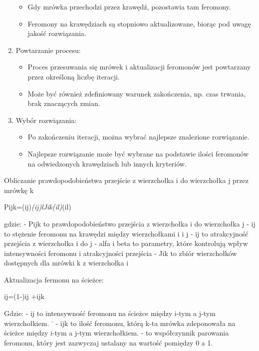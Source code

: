 \documentclass[11pt]{article}
\providecommand{\tightlist}{%
      \setlength{\itemsep}{0pt}\setlength{\parskip}{0pt}}
\begin{document}
\begin{enumerate}
  \begin{itemize}
  \tightlist
  \item
    Gdy mrówka przechodzi przez krawędź, pozostawia tam feromony.
  \item
    Feromony na krawędziach są stopniowo aktualizowane, biorąc pod uwagę
    jakość rozwiązania.
  \end{itemize}
\item
  Powtarzanie procesu:

  \begin{itemize}
  \tightlist
  \item
    Proces przesuwania się mrówek i aktualizacji feromonów jest
    powtarzany przez określoną liczbę iteracji.
  \item
    Może być również zdefiniowany warunek zakończenia, np. czas trwania,
    brak znaczących zmian.
  \end{itemize}
\item
  Wybór rozwiązania:

  \begin{itemize}
  \tightlist
  \item
    Po zakończeniu iteracji, można wybrać najlepsze znalezione
    rozwiązanie.
  \item
    Najlepsze rozwiązanie może być wybrane na podstawie ilości feromonów
    na odwiedzonych krawędziach lub innych kryteriów.
  \end{itemize}
\end{enumerate}

Obliczanie prawdopodobieństwa przejście z wierzchołka i do wierzchołka j
przez mrówkę k

Pijk=(ij)\emph{(ij)lJik(il)}(il)

gdzie: - Pijk to prawdopodobieństwo przejścia z wierzchołka i do
wierzchołka j - ij to stężenie feromonu na krawędzi między wierzchołkami
i i j - ij to atrakcyjność przejścia z wierzchołka i do j - alfa i beta
to parametry, które kontrolują wpływ intensywności feromonu i
atrakcyjności przejścia - Jik to zbiór wierzchołków dostępnych dla
mrówki k z wierzchołka i

Aktualizacja fermonu na ścieżce:

ij=(1-)ij +ijk

Gdzie: - ij to intensywność feromonu na ścieżce między i-tym a j-tym
wierzchołkiem. ˙ - ijk to ilość feromonu, którą k-ta mrówka zdeponowała
na ścieżce między i-tym a j-tym wierzchołkiem. - to współczynnik
parowania feromonu, który jest zazwyczaj ustalany na wartość pomiędzy 0
a 1.
\end{document}
